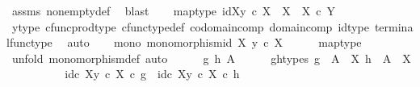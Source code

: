 \begin{isabellebody}
\ assms\ nonempty{\isacharunderscore}{\kern0pt}def\ \isamarkupfalse%
\ blast\isanewline
\ \ \isamarkupfalse%
\ map{\isacharunderscore}{\kern0pt}type{\isacharcolon}{\kern0pt}\ {\isachardoublequoteopen}{\isasymlangle}id{\isacharparenleft}{\kern0pt}X{\isacharparenright}{\kern0pt}{\isacharcomma}{\kern0pt}y\ {\isasymcirc}\isactrlsub c\ {\isasymbeta}\isactrlbsub X\isactrlesub {\isasymrangle}\ {\isacharcolon}{\kern0pt}\ X\ {\isasymrightarrow}\ X\ {\isasymtimes}\isactrlsub c\ Y{\isachardoublequoteclose}\isanewline
\ \ \ \isamarkupfalse%
\ y{\isacharunderscore}{\kern0pt}type\ cfunc{\isacharunderscore}{\kern0pt}prod{\isacharunderscore}{\kern0pt}type\ cfunc{\isacharunderscore}{\kern0pt}type{\isacharunderscore}{\kern0pt}def\ codomain{\isacharunderscore}{\kern0pt}comp\ domain{\isacharunderscore}{\kern0pt}comp\ id{\isacharunderscore}{\kern0pt}type\ terminal{\isacharunderscore}{\kern0pt}func{\isacharunderscore}{\kern0pt}type\ \isamarkupfalse%
\ auto\isanewline
\ \ \isamarkupfalse%
\ mono{\isacharcolon}{\kern0pt}\ {\isachardoublequoteopen}monomorphism{\isacharparenleft}{\kern0pt}{\isasymlangle}id\ X{\isacharcomma}{\kern0pt}\ y\ {\isasymcirc}\isactrlsub c\ {\isasymbeta}\isactrlbsub X\isactrlesub {\isasymrangle}{\isacharparenright}{\kern0pt}{\isachardoublequoteclose}\isanewline
\ \ \ \ \isamarkupfalse%
\ map{\isacharunderscore}{\kern0pt}type\isanewline
\ \ \isamarkupfalse%
\ {\isacharparenleft}{\kern0pt}unfold\ monomorphism{\isacharunderscore}{\kern0pt}def{}{\isacharcomma}{\kern0pt}\ auto{\isacharparenright}{\kern0pt}\isanewline
\ \ \ \ \isamarkupfalse%
\ g\ h\ A\isanewline
\ \ \ \ \isamarkupfalse%
\ g{\isacharunderscore}{\kern0pt}h{\isacharunderscore}{\kern0pt}types{\isacharcolon}{\kern0pt}\ {\isachardoublequoteopen}g\ {\isacharcolon}{\kern0pt}\ A\ {\isasymrightarrow}\ X{\isachardoublequoteclose}\ {\isachardoublequoteopen}h\ {\isacharcolon}{\kern0pt}\ A\ {\isasymrightarrow}\ X{\isachardoublequoteclose}\isanewline
\ \ \ \ \isanewline
\ \ \ \ \isamarkupfalse%
\ {\isachardoublequoteopen}{\isasymlangle}id\isactrlsub c\ X{\isacharcomma}{\kern0pt}y\ {\isasymcirc}\isactrlsub c\ {\isasymbeta}\isactrlbsub X\isactrlesub {\isasymrangle}\ {\isasymcirc}\isactrlsub c\ g\ {\isacharequal}{\kern0pt}\ {\isasymlangle}id\isactrlsub c\ X{\isacharcomma}{\kern0pt}y\ {\isasymcirc}\isactrlsub c\ {\isasymbeta}\isactrlbsub X\isactrlesub {\isasymrangle}\ {\isasymcirc}\isactrlsub c\ h{\isachardoublequoteclose}\isanewline

\end{isabellebody}
